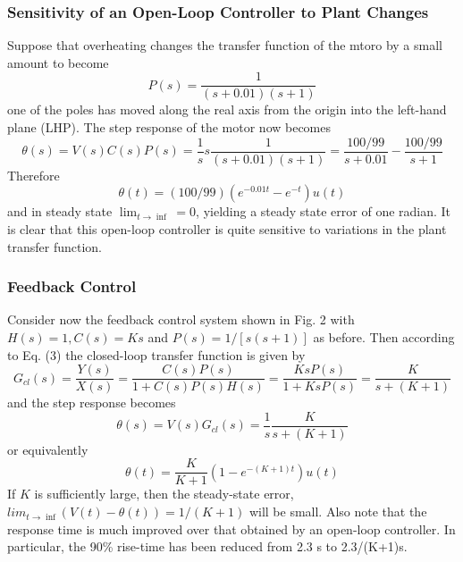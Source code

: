 \documentclass[12pt]{article}
\begin{document}
\subsubsection{Sensitivity of an Open-Loop Controller to Plant Changes}
Suppose that overheating changes the transfer function of the mtoro by a small amount to become
\begin{equation}
P(s)=\frac{1}{(s+0.01)(s+1)}
\end{equation}
one of the poles has moved along the real axis from the origin into the left-hand plane (LHP). The step
response of the motor now becomes
\begin{equation}
\theta(s)=V(s)C(s)P(s)=\frac{1}{s}s\frac{1}{(s+0.01)(s+1)}=\frac{100/99}{s+0.01}-\frac{100/99}{s+1}
\end{equation}
Therefore
\begin{equation}
\theta(t)=(100/99)(e^{-0.01t}-e^{-t})u(t)
\end{equation}
and in steady state $\lim_{t\to\inf}=0$, yielding a steady state error of one radian. It is clear that this open-loop
controller is quite sensitive to variations in the plant transfer function.
\subsubsection{Feedback Control}
Consider now the feedback control system shown in Fig. 2 with $H(s)=1,C(s)=Ks$ and $P(s)=1/[s(s+1)]$ as before. Then according to Eq. (3) the closed-loop transfer function
is given by
\begin{equation}
G_{cl}(s)=\frac{Y(s)}{X(s)}=\frac{C(s)P(s)}{1+C(s)P(s)H(s)}=\frac{KsP(s)}{1+KsP(s)}=\frac{K}{s+(K+1)}
\end{equation}
and the step response becomes
\begin{equation}
\theta(s)=V(s)G_{cl}(s)=\frac{1}{s}\frac{K}{s+(K+1)}
\end{equation}
or equivalently
\begin{equation}
\theta(t)=\frac{K}{K+1}(1-e^{-(K+1)t})u(t)
\end{equation}
If $K$ is sufficiently large, then the steady-state error, $lim_{t\to\inf}(V(t)−\theta(t))=1/(K+1)$ will be small. Also
note that the response time is much improved over that obtained by an open-loop controller. In particular,
the 90\% rise-time has been reduced from 2.3 s to 2.3/(K+1)s.
\end{document}
